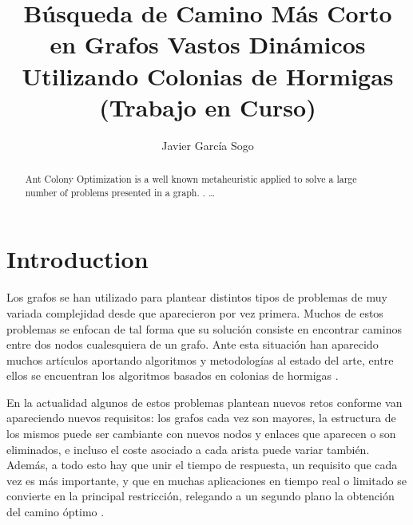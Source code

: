 \documentclass{llncs}
\begin{document}
%
\mainmatter              %
%
\title{Búsqueda de Camino Más Corto en Grafos Vastos Dinámicos Utilizando Colonias de Hormigas (Trabajo en Curso)}
%
%
\author{Javier Garc{\'i}a Sogo}
%
%
%

\maketitle              %

\begin{abstract}
Ant Colony Optimization is a well known metaheuristic applied to solve a large number of problems presented in a graph. 
. \dots
{}
\end{abstract}
%
\section{Introduction}
%
Los grafos se han utilizado para plantear distintos tipos de problemas de muy variada complejidad desde que aparecieron por vez primera.
Muchos de estos problemas se enfocan de tal forma que su solución consiste en encontrar caminos entre dos nodos cualesquiera de un grafo. 
Ante esta situación han aparecido muchos artículos aportando algoritmos y metodologías al estado del arte, entre ellos se encuentran los algoritmos basados en colonias de hormigas \cite{Dorigo1992}.

En la actualidad algunos de estos problemas plantean nuevos retos conforme van apareciendo nuevos requisitos: los grafos cada vez son mayores, la estructura de los mismos puede ser cambiante con nuevos nodos y enlaces que aparecen o son eliminados, e incluso el coste asociado a cada arista puede variar también.
Además, a todo esto hay que unir el tiempo de respuesta, un requisito que cada vez es más importante, y que en muchas aplicaciones en tiempo real o limitado se convierte en la principal restricción, relegando a un segundo plano la obtención del camino óptimo \cite{Rivero2011}.
\end{document}
